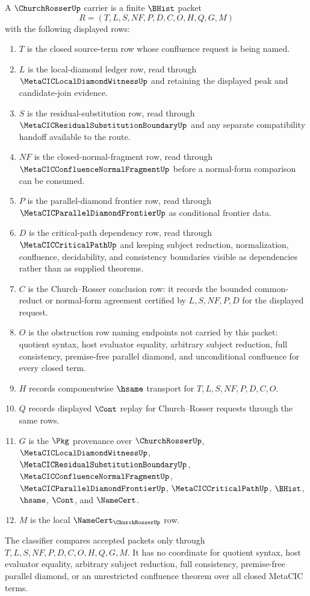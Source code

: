 \begin{definition}
\label{def:church-rosser-carrier}
A $\ChurchRosserUp$ carrier is a finite $\BHist$ packet
$$
R=(T,L,S,NF,P,D,C,O,H,Q,G,M)
$$
with the following displayed rows:
\begin{enumerate}
\item $T$ is the closed source-term row whose confluence request is being named.
\item $L$ is the local-diamond ledger row, read through $\MetaCICLocalDiamondWitnessUp$ and retaining the displayed peak and candidate-join evidence.
\item $S$ is the residual-substitution row, read through $\MetaCICResidualSubstitutionBoundaryUp$ and any separate compatibility handoff available to the route.
\item $NF$ is the closed-normal-fragment row, read through $\MetaCICConfluenceNormalFragmentUp$ before a normal-form comparison can be consumed.
\item $P$ is the parallel-diamond frontier row, read through $\MetaCICParallelDiamondFrontierUp$ as conditional frontier data.
\item $D$ is the critical-path dependency row, read through $\MetaCICCriticalPathUp$ and keeping subject reduction, normalization, confluence, decidability, and consistency boundaries visible as dependencies rather than as supplied theorems.
\item $C$ is the Church--Rosser conclusion row: it records the bounded common-reduct or normal-form agreement certified by $L,S,NF,P,D$ for the displayed request.
\item $O$ is the obstruction row naming endpoints not carried by this packet: quotient syntax, host evaluator equality, arbitrary subject reduction, full consistency, premise-free parallel diamond, and unconditional confluence for every closed term.
\item $H$ records componentwise $\hsame$ transport for $T,L,S,NF,P,D,C,O$.
\item $Q$ records displayed $\Cont$ replay for Church--Rosser requests through the same rows.
\item $G$ is the $\Pkg$ provenance over $\ChurchRosserUp$, $\MetaCICLocalDiamondWitnessUp$, $\MetaCICResidualSubstitutionBoundaryUp$, $\MetaCICConfluenceNormalFragmentUp$, $\MetaCICParallelDiamondFrontierUp$, $\MetaCICCriticalPathUp$, $\BHist$, $\hsame$, $\Cont$, and $\NameCert$.
\item $M$ is the local $\NameCert_{\ChurchRosserUp}$ row.
\end{enumerate}
The classifier compares accepted packets only through $T,L,S,NF,P,D,C,O,H,Q,G,M$. It has no coordinate for quotient syntax, host evaluator equality, arbitrary subject reduction, full consistency, premise-free parallel diamond, or an unrestricted confluence theorem over all closed MetaCIC terms.
\end{definition}

